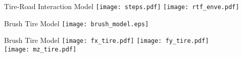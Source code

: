\begin{frame}{Tire-Road Interaction Model}
  \vspace{-1.0em}
  \centering
  \texttt{[image: steps.pdf]}%
  \texttt{[image: rtf\_enve.pdf]}
\end{frame}

\begin{frame}{Brush Tire Model}
  \vspace{-1.0em}
  \centering
  \texttt{[image: brush\_model.eps]}
\end{frame}

\begin{frame}{Brush Tire Model}
  \vspace{-1.0em}
  \centering
  \texttt{[image: fx\_tire.pdf]}%
  \texttt{[image: fy\_tire.pdf]} \\
  \texttt{[image: mz\_tire.pdf]}
\end{frame}

